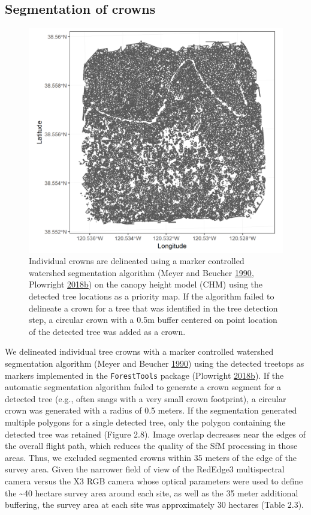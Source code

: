 \documentclass[twoside,12pt,final]{ucthesis-CA2012}
\begin{document}
\begin{ucmainmatter}
\subsection{Segmentation of crowns}\label{segmentation-of-crowns}
\begin{figure}
\centering
\includegraphics[width=6.00000in]{figure/chap02/eldo_3k_3_crowns.png}
\caption{Individual crowns are delineated using a marker controlled
watershed segmentation algorithm (Meyer and Beucher
\protect\hyperlink{ref-meyer1990}{1990}, Plowright
\protect\hyperlink{ref-plowright2018}{2018}\protect\hyperlink{ref-plowright2018}{b})
on the canopy height model (CHM) using the detected tree locations as a
priority map. If the algorithm failed to delineate a crown for a tree
that was identified in the tree detection step, a circular crown with a
0.5m buffer centered on point location of the detected tree was added as
a crown.}
\end{figure}
We delineated individual tree crowns with a marker controlled watershed
segmentation algorithm (Meyer and Beucher
\protect\hyperlink{ref-meyer1990}{1990}) using the detected treetops as
markers implemented in the \texttt{ForestTools} package (Plowright
\protect\hyperlink{ref-plowright2018}{2018}\protect\hyperlink{ref-plowright2018}{b}).
If the automatic segmentation algorithm failed to generate a crown
segment for a detected tree (e.g., often snags with a very small crown
footprint), a circular crown was generated with a radius of 0.5 meters.
If the segmentation generated multiple polygons for a single detected
tree, only the polygon containing the detected tree was retained (Figure
2.8). Image overlap decreases near the edges of the overall flight path,
which reduces the quality of the SfM processing in those areas. Thus, we
excluded segmented crowns within 35 meters of the edge of the survey
area. Given the narrower field of view of the RedEdge3 multispectral
camera versus the X3 RGB camera whose optical parameters were used to
define the \textasciitilde{}40 hectare survey area around each site, as
well as the 35 meter additional buffering, the survey area at each site
was approximately 30 hectares (Table 2.3).


\end{ucmainmatter}
\end{document}
